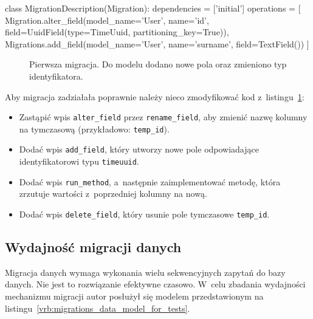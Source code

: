 \begin{verbbox}[\footnotesize]
class MigrationDescription(Migration):
    dependencies = ['initial']
    operations = [
        Migration.alter_field(model_name='User',
            name='id',
            field=UuidField(type=TimeUuid, partitioning_key=True)),
        Migrations.add_field(model_name='User',
            name='surname',
            field=TextField())
    ]
\end{verbbox}

\begin{figure}[ht!]
	\centering
	\theverbbox
	\caption{Pierwsza migracja. Do modelu dodano nowe pola oraz zmieniono typ identyfikatora.}
	\label{vrb:first_migration}
\end{figure}

Aby migracja zadziałała poprawnie należy nieco zmodyfikować kod z~listingu~\ref{vrb:first_migration}:

\begin{itemize}
	\item Zastąpić wpis \verb+alter_field+ przez \verb+rename_field+, aby zmienić nazwę kolumny na tymczasową (przykładowo: \verb+temp_id+).
	\item Dodać wpis \verb+add_field+, który utworzy nowe pole odpowiadające identyfikatorowi typu \verb+timeuuid+.
	\item Dodać wpis \verb+run_method+, a~następnie zaimplementować metodę, która zrzutuje wartości z~poprzedniej kolumny na nową.
	\item Dodać wpis \verb+delete_field+, który usunie pole tymczasowe \verb+temp_id+.
\end{itemize}

\subsection{Wydajność migracji danych}
\label{sec:ocm_migrations_performance}

Migracja danych wymaga wykonania wielu sekwencyjnych zapytań do bazy danych. Nie jest to rozwiązanie efektywne czasowo. W~celu zbadania wydajności mechanizmu migracji autor posłużył się modelem przedstawionym na listingu~\ref{vrb:migrations_data_model_for_tests}.


